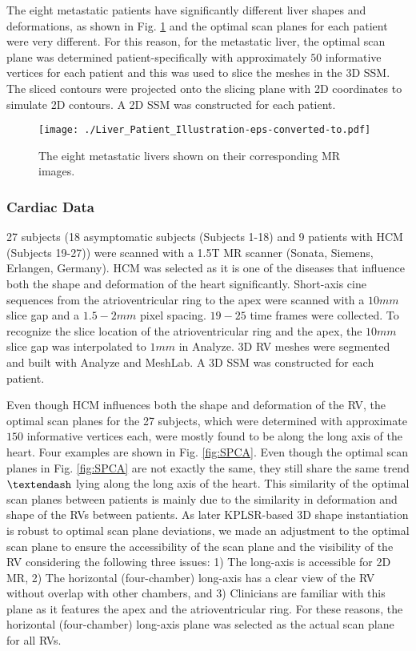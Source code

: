 \documentclass[review]{elsarticle}
\begin{document}
The eight metastatic patients have significantly different liver shapes and deformations, as shown in Fig. \ref{fig:Liver_Patient_Illustration} and the optimal scan planes for each patient were very different. For this reason, for the metastatic liver, the optimal scan plane was determined patient-specifically with approximately $50$ informative vertices for each patient and this was used to slice the meshes in the 3D SSM. The sliced contours were projected onto the slicing plane with 2D coordinates to simulate 2D contours. A 2D SSM was constructed for each patient.

\begin{figure}[thpb]
\centering
\texttt{[image: ./Liver\_Patient\_Illustration-eps-converted-to.pdf]}
\caption{The eight metastatic livers shown on their corresponding MR images.}
\label{fig:Liver_Patient_Illustration}
\end{figure}

\subsubsection{Cardiac Data}
\label{Sec: Cardiac Data}
27 subjects (18 asymptomatic subjects (Subjects 1-18) and 9 patients with HCM (Subjects 19-27)) were scanned with a 1.5T MR scanner (Sonata, Siemens, Erlangen, Germany). HCM was selected as it is one of the diseases that influence both the shape and deformation of the heart significantly. Short-axis cine sequences from the atrioventricular ring to the apex were scanned with a $10mm$ slice gap and a $1.5-2mm$ pixel spacing. $19-25$ time frames were collected. To recognize the slice location of the atrioventricular ring and the apex, the $10mm$ slice gap was interpolated to $1mm$ in Analyze. 3D RV meshes were segmented and built with Analyze and MeshLab. A 3D SSM was constructed for each patient.

Even though HCM influences both the shape and deformation of the RV, the optimal scan planes for the 27 subjects, which were determined with approximate $150$ informative vertices each, were mostly found to be along the long axis of the heart. Four examples are shown in Fig. \ref{fig:SPCA}. Even though the optimal scan planes in Fig. \ref{fig:SPCA} are not exactly the same, they still share the same trend $\textendash$ lying along the long axis of the heart. This similarity of the optimal scan planes between patients is mainly due to the similarity in deformation and shape of the RVs between patients. As later KPLSR-based 3D shape instantiation is robust to optimal scan plane deviations, we made an adjustment to the optimal scan plane to ensure the accessibility of the scan plane and the visibility of the RV considering the following three issues: 1) The long-axis is accessible for 2D MR, 2) The horizontal (four-chamber) long-axis has a clear view of the RV without overlap with other chambers, and 3) Clinicians are familiar with this plane as it features the apex and the atrioventricular ring. For these reasons, the horizontal (four-chamber) long-axis plane was selected as the actual scan plane for all RVs.  
\end{document}
